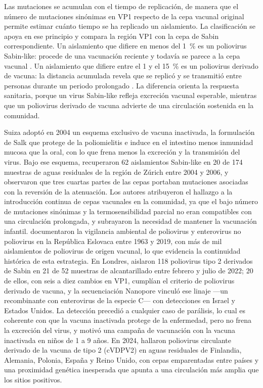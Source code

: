 Las mutaciones se acumulan con el tiempo de replicación, de manera que el número de mutaciones sinónimas en VP1 respecto de la cepa vacunal original permite estimar cuánto tiempo se ha replicado un aislamiento. La clasificación se apoya en ese principio y compara la región VP1 con la cepa de Sabin correspondiente. Un aislamiento que difiere en menos del 1~\% es un poliovirus Sabin-like: procede de una vacunación reciente y todavía se parece a la cepa vacunal \cite{Klapsa_2022}. Un aislamiento que difiere entre el 1 y el 15~\% es un poliovirus derivado de vacuna: la distancia acumulada revela que se replicó y se transmitió entre personas durante un periodo prolongado \cite{Zurbriggen_2008}. La diferencia orienta la respuesta sanitaria, porque un virus Sabin-like refleja excreción vacunal esperable, mientras que un poliovirus derivado de vacuna advierte de una circulación sostenida en la comunidad.

Suiza adoptó en 2004 un esquema exclusivo de vacuna inactivada, la formulación de Salk que protege de la poliomielitis e induce en el intestino menos inmunidad mucosa que la oral, con lo que frena menos la excreción y la transmisión del virus. Bajo ese esquema,  recuperaron 62 aislamientos Sabin-like en 20 de 174 muestras de aguas residuales de la región de Zúrich entre 2004 y 2006, y observaron que tres cuartas partes de las cepas portaban mutaciones asociadas con la reversión de la atenuación. Los autores atribuyeron el hallazgo a la introducción continua de cepas vacunales en la comunidad, ya que el bajo número de mutaciones sinónimas y la termosensibilidad parcial no eran compatibles con una circulación prolongada, y subrayaron la necesidad de mantener la vacunación infantil.  documentaron la vigilancia ambiental de poliovirus y enterovirus no poliovirus en la República Eslovaca entre 1963 y 2019, con más de mil aislamientos de poliovirus de origen vacunal, lo que evidencia la continuidad histórica de esta estrategia. En Londres,  aislaron 118 poliovirus tipo 2 derivados de Sabin en 21 de 52 muestras de alcantarillado entre febrero y julio de 2022; 20 de ellos, con seis a diez cambios en VP1, cumplían el criterio de poliovirus derivado de vacuna, y la secuenciación Nanopore vinculó ese linaje —un recombinante con enterovirus de la especie C— con detecciones en Israel y Estados Unidos. La detección precedió a cualquier caso de parálisis, lo cual es coherente con que la vacuna inactivada protege de la enfermedad, pero no frena la excreción del virus, y motivó una campaña de vacunación con la vacuna inactivada en niños de 1 a 9 años. En 2024,  hallaron poliovirus circulante derivado de la vacuna de tipo 2 (cVDPV2) en aguas residuales de Finlandia, Alemania, Polonia, España y Reino Unido, con cepas emparentadas entre países y una proximidad genética inesperada que apunta a una circulación más amplia que los sitios positivos.

